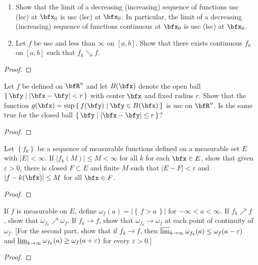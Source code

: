 \begin{problem}
\begin{enumerate}[label=(\alph*)]
\item Show that the limit of a decreasing (increasing) sequence of
  functions usc (lsc) at $\bfx_0$ is usc (lsc) at $\bfx_0$. In particular,
  the limit of a decreasing (increasing) sequence of functions continuous
  at $\bfx_0$ is usc (lsc) at $\bfx_0$.
\item Let $f$ be usc and less than $\infty$ on $[a,b]$. Show that there
  exists continuous $f_k$ on $[a,b]$ such that $f_k\searrow f$.
\end{enumerate}
\end{problem}
\begin{proof}
\end{proof}
\newpage

\begin{problem}
Let $f$ be defined on $\bfR^n$ and let $B(\bfx)$ denote the open ball
$\left\{\,\bfy\;\middle|\;\left|\bfx-\bfy\right|<r\,\right\}$ with center
$\bfx$ and fixed radius $r$. Show that the function
$g(\bfx)=\sup\left\{\,f(\bfy)\;\middle|\;\bfy\in B(\bfx)\,\right\}$ is usc
on $\bfR^n$. Is the same true for the closed ball
$\left\{\,\bfy\;\middle|\;\left|\bfx-\bfy\right|\leq r\,\right\}$?
\end{problem}
\begin{proof}
\end{proof}
\newpage

\begin{problem}
Let $\left\{f_k\right\}$ be a sequence of measurable functions defined on a
measurable set $E$ with $|E|<\infty$. If $|f_k(M)|\leq M<\infty$ for all
$k$ for each $\bfx\in E$, show that given $\varepsilon>0$, there is closed
$F\subset E$ and finite $M$ such that $|E\minus F|<\varepsilon$ and
$|f-k(\bfx)|\leq M$ for all $\bfx\in F$.
\end{problem}
\begin{proof}
\end{proof}
\newpage

\begin{problem}
If $f$ is measurable on $E$, define
$\omega_f(a)=\left|\left\{\,f>a\,\right\}\right|$ for
$-\infty<a<\infty$. If $f_k\nearrow f$, show that
$\omega_{f_k}\nearrow\omega_f$. If $f_k\to f$, show that
$\omega_{f_k}\to\omega_f$ at each point of continuity of $\omega_f$. [For
the second part, show that if $f_k\to f$, then
$\varlimsup_{k\to\infty}\omega_{f_k}(a)\leq\omega_f(a-\varepsilon)$ and
$\varliminf_{k\to\infty}\omega_{f_k}(a)\geq\omega_f(a+\varepsilon)$ for every
$\varepsilon>0$.]
\end{problem}
\begin{proof}
\end{proof}
\newpage


